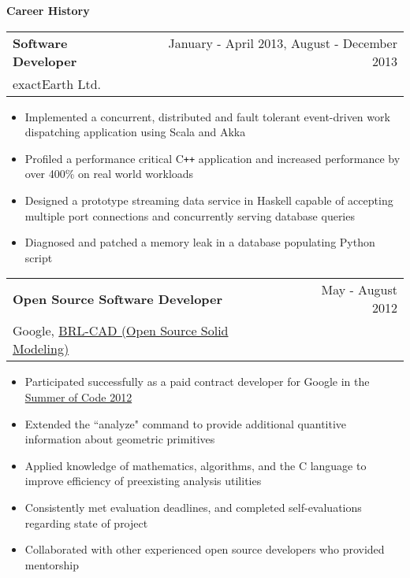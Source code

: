 \documentclass[10pt]{article}
\makeatletter
\newcommand{\resheading}[1]{{\large \colorbox{headercol}{\begin{minipage}{\textwidth}{\textbf{#1 \vphantom{p\^{E}}}}\end{minipage}}}}
\newcommand{\ressubheading}[3]{\item
\begin{tabular*}{7in}{l@{\extracolsep{\fill}}r}
    \textbf{#1} & #2 \\ #3
\end{tabular*}\vspace{-4pt}}
\makeatother
\begin{document}
\resheading{Career History}
\begin{description}
    \ressubheading{Software Developer} {January - April 2013, August - December 2013} {exactEarth Ltd.}
    \begin{itemize}
        \item{Implemented a concurrent, distributed and fault tolerant event-driven work dispatching application using Scala and Akka}
        \item{Profiled a performance critical C\texttt{++} application and increased performance by over 400\% on real world workloads}
        \item{Designed a prototype streaming data service in Haskell capable of accepting multiple port connections and concurrently serving database queries}
        \item{Diagnosed and patched a memory leak in a database populating Python script}
    \end{itemize}
    \ressubheading{Open Source Software Developer} {May - August 2012} {Google, \href{http://brlcad.org}{BRL-CAD (Open Source Solid Modeling)}}
    \begin{itemize}
        \item{Participated successfully as a paid contract developer for Google in the \href{https://google-melange.appspot.com/gsoc/homepage/google/gsoc2012}{Summer of Code 2012}}
        \item{Extended the ``analyze" command to provide additional quantitive information about geometric primitives}
        \item{Applied knowledge of mathematics, algorithms, and the C language to improve efficiency of preexisting analysis utilities}
        \item{Consistently met evaluation deadlines, and completed self-evaluations regarding state of project}
        \item{Collaborated with other experienced open source developers who provided mentorship}
    \end{itemize}
\end{description}
\end{document}

